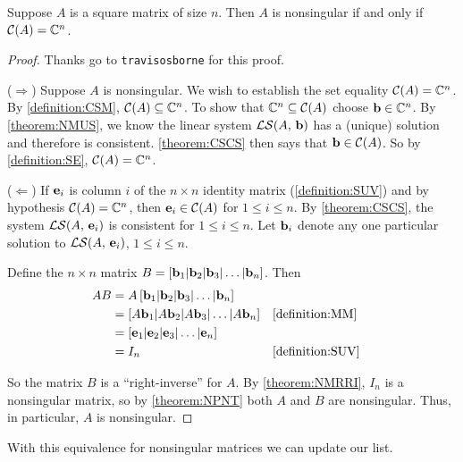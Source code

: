 \documentclass{ximera}
\begin{document}
\begin{theorem}
  \label{theorem:CSNM}

  Suppose $A$ is a square matrix of size $n$.  Then $A$ is nonsingular
  if and only if $\mathcal{C}\!\left(A\right)=\mathbb{C}^{n}$.

  \begin{proof} 
    Thanks go to \texttt{travisosborne} for this proof.

    ($\Rightarrow$) Suppose $A$ is nonsingular.  We wish to establish
    the set equality $\mathcal{C}\!\left(A\right)=\mathbb{C}^{n}$.  By \ref{definition:CSM},
    $\mathcal{C}\!\left(A\right)\subseteq\mathbb{C}^{n}$.  To show that
    $\mathbb{C}^{n}\subseteq\mathcal{C}\!\left(A\right)$ choose $\mathbf{b}\in\mathbb{C}^{n}$.  By
    \ref{theorem:NMUS}, we know the linear system
    $\mathcal{LS}\!\left(A,\,\mathbf{b}\right)$ has a (unique) solution and therefore
    is consistent.  \ref{theorem:CSCS} then says that
    $\mathbf{b}\in\mathcal{C}\!\left(A\right)$.  So by \ref{definition:SE},
    $\mathcal{C}\!\left(A\right)=\mathbb{C}^{n}$.

    ($\Leftarrow$) If $\mathbf{e}_i$ is column $i$ of the $n\times n$
    identity matrix (\ref{definition:SUV}) and by hypothesis
    $\mathcal{C}\!\left(A\right)=\mathbb{C}^{n}$, then $\mathbf{e}_i\in\mathcal{C}\!\left(A\right)$ for
    $1\leq i\leq n$.  By \ref{theorem:CSCS}, the system
    $\mathcal{LS}\!\left(A,\,\mathbf{e}_i\right)$ is consistent for $1\leq i\leq n$.
    Let $\mathbf{b}_i$ denote any one particular solution to
    $\mathcal{LS}\!\left(A,\,\mathbf{e}_i\right)$, $1\leq i\leq n$.

    Define the $n\times n$ matrix $B=\left\lbrack\mathbf{b}_{1}|\mathbf{b}_{2}|\mathbf{b}_{3}|\ldots|\mathbf{b}_{n}\right\rbrack$.  Then
    \begin{align*}
      AB
      &=A\left\lbrack\mathbf{b}_{1}|\mathbf{b}_{2}|\mathbf{b}_{3}|\ldots|\mathbf{b}_{n}\right\rbrack\\
      &=[A\mathbf{b}_1|A\mathbf{b}_2|A\mathbf{b}_3|\ldots|A\mathbf{b}_n]&&\ref{definition:MM}\\
      &=\left\lbrack\mathbf{e}_{1}|\mathbf{e}_{2}|\mathbf{e}_{3}|\ldots|\mathbf{e}_{n}\right\rbrack\\
      &=I_n&&\ref{definition:SUV}\\
    \end{align*}

    So the matrix $B$ is a ``right-inverse'' for $A$.  By
    \ref{theorem:NMRRI}, $I_n$ is a nonsingular matrix, so by
    \ref{theorem:NPNT} both $A$ and $B$ are nonsingular.  Thus, in
    particular, $A$ is nonsingular.
  \end{proof}
\end{theorem}

With this equivalence for nonsingular matrices we can update our list.
\end{document}

